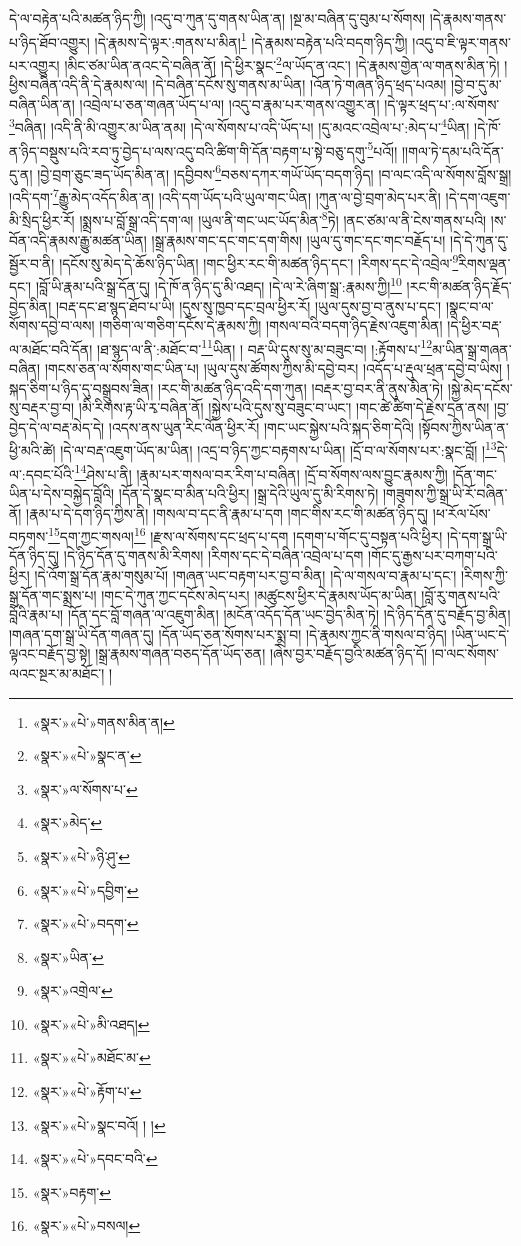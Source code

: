 དེ་ལ་བརྟེན་པའི་མཚན་ཉིད་ཀྱི། །འདུ་བ་ཀུན་དུ་གནས་ཡིན་ན། །སྔ་མ་བཞིན་དུ་བུམ་པ་སོགས། །དེ་རྣམས་གནས་པ་ཉིད་ཐོབ་འགྱུར། །དེ་རྣམས་དེ་ལྟར་:གནས་པ་མིན།\footnote{«སྣར་»«པེ་»གནས་མིན་ན།} །དེ་རྣམས་བརྟེན་པའི་བདག་ཉིད་ཀྱི། །འདུ་བ་ཇི་ལྟར་གནས་པར་འགྱུར། །མིང་ཙམ་ཡིན་ནའང་དེ་བཞིན་ནོ། །དེ་ཕྱིར་སྣང་\footnote{«སྣར་»«པེ་»སྣང་ན་}ལ་ཡོད་ན་འང་། །དེ་རྣམས་གྱེན་ལ་གནས་མིན་ཏེ། །ཕྱིས་བཞིན་འདི་ནི་དེ་རྣམས་ལ། །དེ་བཞིན་དངོས་སུ་གནས་མ་ཡིན། །འོན་ཏེ་གཞན་ཉིད་ཕྲད་པའམ། །བྱེ་བ་དུ་མ་བཞིན་ཡིན་ན། །འབྲེལ་པ་ཅན་གཞན་ཡོད་པ་ལ། །འདུ་བ་རྣམ་པར་གནས་འགྱུར་ན། །དེ་ལྟར་ཕྲད་པ་:ལ་སོགས་\footnote{«སྣར་»ལ་སོགས་པ་}བཞིན། །འདི་ནི་མི་འགྱུར་མ་ཡིན་ནམ། །དེ་ལ་སོགས་པ་འདི་ཡོད་པ། །དུ་མའང་འབྲེལ་པ་:མེད་པ་\footnote{«སྣར་»མེད་}ཡིན། །དེ་ཁོ་ན་ཉིད་བསྡུས་པའི་རབ་ཏུ་བྱེད་པ་ལས་འདུ་བའི་ཚིག་གི་དོན་བརྟག་པ་སྟེ་བཅུ་དགུ་\footnote{«སྣར་»«པེ་»ཉི་ཤུ་}པའོ།། །།གལ་ཏེ་དམ་པའི་དོན་དུ་ན། །བྱེ་བྲག་ཅུང་ཟད་ཡོད་མིན་ན། །དབྱིབས་\footnote{«སྣར་»«པེ་»དབྱིག་}བཅས་དཀར་གཡོ་ཡོད་བདག་ཉིད། །བ་ལང་འདི་ལ་སོགས་བློས་སྒྲ། །འདི་དག་\footnote{«སྣར་»«པེ་»བདག་}རྒྱུ་མེད་འདོད་མིན་ན། །འདི་དག་ཡོད་པའི་ཡུལ་གང་ཡིན། །ཀུན་ལ་བྱེ་བྲག་མེད་པར་ནི། །དེ་དག་འཇུག་མི་སྲིད་ཕྱིར་རོ། །སྨྲས་པ་བློ་སྒྲ་འདི་དག་ལ། །ཡུལ་ནི་གང་ཡང་ཡོད་མིན་\footnote{«སྣར་»ཡིན་}ཏེ། །ནང་ཙམ་ལ་ནི་ངེས་གནས་པའི། །ས་བོན་འདི་རྣམས་རྒྱུ་མཚན་ཡིན། །སྒྲ་རྣམས་གང་དང་གང་དག་གིས། །ཡུལ་དུ་གང་དང་གང་བརྗོད་པ། །དེ་དེ་ཀུན་དུ་སྦྱོར་བ་ནི། །དངོས་སུ་མེད་དེ་ཆོས་ཉིད་ཡིན། །གང་ཕྱིར་རང་གི་མཚན་ཉིད་དང་། །རིགས་དང་དེ་འབྲེལ་\footnote{«སྣར་»འགྲེལ་}རིགས་ལྡན་དང་། །བློ་ཡི་རྣམ་པའི་སྒྲ་དོན་དུ། །དེ་ཁོ་ན་ཉིད་དུ་མི་འཐད། །དེ་ལ་རེ་ཞིག་སྒྲ་:རྣམས་ཀྱི།\footnote{«སྣར་»«པེ་»མི་འཐད།} །རང་གི་མཚན་ཉིད་རྗོད་བྱེད་མིན། །བརྡ་དང་ཐ་སྙད་ཐོབ་པ་ཡི། །དུས་སུ་ཁྱབ་དང་བྲལ་ཕྱིར་རོ། །ཡུལ་དུས་བྱ་བ་ནུས་པ་དང་། །སྣང་བ་ལ་སོགས་དབྱེ་བ་ལས། །གཅིག་ལ་གཅིག་དངོས་དེ་རྣམས་ཀྱི། །གསལ་བའི་བདག་ཉིད་རྗེས་འཇུག་མིན། །དེ་ཕྱིར་བརྡ་ལ་མཐོང་བའི་དོན། །ཐ་སྙད་ལ་ནི་:མཐོང་བ་\footnote{«སྣར་»«པེ་»མཐོང་མ་}ཡིན། །
བརྡ་ཡི་དུས་སུ་མ་བཟུང་བ། །:རྟོགས་པ་\footnote{«སྣར་»«པེ་»རྟོག་པ་}མ་ཡིན་སྒྲ་གཞན་བཞིན། །གངས་ཅན་ལ་སོགས་གང་ཡིན་པ། །ཡུལ་དུས་ཚོགས་ཀྱིས་མི་དབྱེ་བར། །འདོད་པ་རྡུལ་ཕྲན་དབྱེ་བ་ཡིས། །སྐད་ཅིག་པ་ཉིད་དུ་བསྒྲུབས་ཟིན། །རང་གི་མཚན་ཉིད་འདི་དག་ཀུན། །བརྡར་བྱ་བར་ནི་ནུས་མིན་ཏེ། །སྐྱེ་མེད་དངོས་སུ་བརྡར་བྱ་བ། །མི་རིགས་རྟ་ཡི་རྭ་བཞིན་ནོ། །སྐྱེས་པའི་དུས་སུ་བཟུང་བ་ཡང་། །གང་ཚེ་ཚིག་དེ་རྗེས་དྲན་ནས། །བྱ་བྱེད་དེ་ལ་བརྡ་མེད་དེ། །འདས་ནས་ཡུན་རིང་ལོན་ཕྱིར་རོ། །གང་ཡང་སྐྱེས་པའི་སྐད་ཅིག་དེའི། །སྟོབས་ཀྱིས་ཡིན་ན་ཕྱི་མའི་ཚེ། །དེ་ལ་བརྡ་འཇུག་ཡོད་མ་ཡིན། །འདྲ་བ་ཉིད་ཀྱང་བརྟགས་པ་ཡིན། །དྲོ་བ་ལ་སོགས་པར་:སྣང་བློ། །\footnote{«སྣར་»«པེ་»སྣང་བའོ། ། །}དེ་ལ་:དབང་པོའི་\footnote{«སྣར་»«པེ་»དབང་བའི་}ཤེས་པ་ནི། །རྣམ་པར་གསལ་བར་རིག་པ་བཞིན། །དྲོ་བ་སོགས་ལས་བྱུང་རྣམས་ཀྱི། །དོན་གང་ཡིན་པ་དེས་བསྐྱེད་བློའི། །དོན་དེ་སྣང་བ་མིན་པའི་ཕྱིར། །སྒྲ་དེའི་ཡུལ་དུ་མི་རིགས་ཏེ། །གཟུགས་ཀྱི་སྒྲ་ཡི་རོ་བཞིན་ནོ། །རྣམ་པ་དེ་དག་ཉིད་ཀྱིས་ནི། །གསལ་བ་དང་ནི་རྣམ་པ་དག །གང་གིས་རང་གི་མཚན་ཉིད་དུ། །ཕ་རོལ་པོས་བཏགས་\footnote{«སྣར་»བརྟག་}དག་ཀྱང་གསལ།\footnote{«སྣར་»«པེ་»བསལ།} །རྫས་ལ་སོགས་དང་ཕྲད་པ་དག །དགག་པ་གོང་དུ་བསྟན་པའི་ཕྱིར། །དེ་དག་སྒྲ་ཡི་དོན་ཉིད་དུ། །དེ་ཉིད་དོན་དུ་གནས་མི་རིགས། །རིགས་དང་དེ་བཞིན་འབྲེལ་པ་དག །གོང་དུ་རྒྱས་པར་བཀག་པའི་ཕྱིར། །དེ་འོག་སྒྲ་དོན་རྣམ་གསུམ་པོ། །གཞན་ཡང་བརྟག་པར་བྱ་བ་མིན། །དེ་ལ་གསལ་བ་རྣམ་པ་དང་། །རིགས་ཀྱི་སྒྲ་དོན་གང་སྨྲས་པ། །གང་དེ་ཀུན་ཀྱང་དངོས་མེད་པར། །མཚུངས་ཕྱིར་དེ་རྣམས་ཡོད་མ་ཡིན། །བློ་རུ་གནས་པའི་བློའི་རྣམ་པ། །དོན་དང་བློ་གཞན་ལ་འཇུག་མིན། །མངོན་འདོད་དོན་ཡང་བྱེད་མིན་ཏེ། །དེ་ཉིད་དོན་དུ་བརྗོད་བྱ་མིན། །གཞན་དག་སྒྲ་ཡི་དོན་གཞན་དུ། །དོན་ཡོད་ཅན་སོགས་པར་སྨྲ་བ། །དེ་རྣམས་ཀྱང་ནི་གསལ་བ་ཉིད། །ཡིན་ཡང་དེ་ལྟའང་བརྗོད་བྱ་སྟེ། །སྒྲ་རྣམས་གཞན་བཅད་དོན་ཡོད་ཅན། །ཞེས་བྱར་བརྗོད་བྱའི་མཚན་ཉིད་དོ། །བ་ལང་སོགས་ལའང་སྔར་མ་མཐོང་། །
